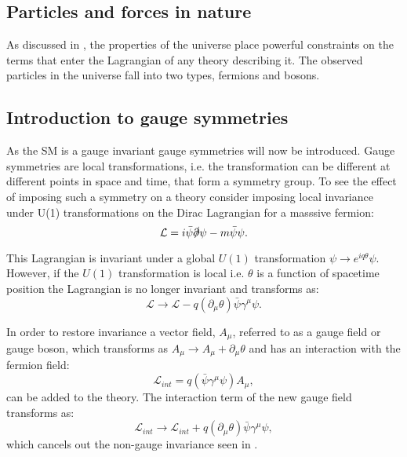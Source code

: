 \subsection{Particles and forces in nature}
\label{sec:symmetriesandfields}
As discussed in , the properties of the universe place powerful constraints on the terms that enter the Lagrangian of any theory describing it. The observed particles in the universe fall into two types, fermions and bosons. 


\subsection{Introduction to gauge symmetries}
\label{sec:gaugesym}
As the SM is a gauge invariant gauge symmetries will now be introduced. Gauge symmetries are local transformations, i.e. the transformation can be different at different points in space and time, that form a symmetry group. To see the effect of imposing such a symmetry on a theory consider imposing local invariance under U(1) transformations on the Dirac Lagrangian for a masssive fermion:
\begin{equation}
  \label{eq:globaldiraclagrangian}
  \mathcal{L}=i\bar{\psi}\slashed{\partial}\psi-m\bar{\psi}\psi.
\end{equation}

This Lagrangian is invariant under a global $U(1)$ transformation $\psi\rightarrow e^{iq\theta}\psi$. However, if the $U(1)$ transformation is local i.e. $\theta$ is a function of spacetime position the Lagrangian is no longer invariant and transforms as:
\begin{equation}
  \label{eq:gaugeviolating}
  \mathcal{L}\rightarrow\mathcal{L}-q(\partial_{\mu}\theta)\bar{\psi}\gamma^{\mu}\psi.
\end{equation}

In order to restore invariance a vector field, $A_{\mu}$, referred to as a gauge field or gauge boson, which transforms as $A_{\mu}\rightarrow A_{\mu}+\partial_{\mu}\theta$ and has an interaction with the fermion field:
\begin{equation}
  \mathcal{L}_{int}=q(\bar{\psi}\gamma^{\mu}\psi) A_{\mu},
\end{equation}
 can be added to the theory. The interaction term of the new gauge field transforms as:
\begin{equation}
  \mathcal{L}_{int}\rightarrow \mathcal{L}_{int}+q(\partial_{\mu}\theta)\bar{\psi}\gamma^{\mu}\psi,
\end{equation}
which cancels out the non-gauge invariance seen in .

